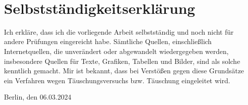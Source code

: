 \documentclass{scrartcl}
\theoremstyle{plain}
\theoremstyle{definition}
\begin{document}

\newpage~
\thispagestyle{empty}
\newpage
\thispagestyle{empty}

\section*{Selbstständigkeitserklärung}

Ich erkläre, dass ich die vorliegende Arbeit selbstständig und noch nicht für andere Prüfungen eingereicht habe. Sämtliche Quellen, einschließlich Internetquellen, die unverändert oder abgewandelt wiedergegeben werden, insbesondere Quellen für Texte, Grafiken, Tabellen und Bilder, sind als solche kenntlich gemacht. Mir ist bekannt, dass bei Verstößen gegen diese Grundsätze ein Verfahren wegen Täuschungsversuchs bzw. Täuschung eingeleitet wird.


\vspace{2\baselineskip}
{\raggedright Berlin, den 06.03.2024 \hfill \TitelPunktLinie{8cm}\\}
\end{document}
